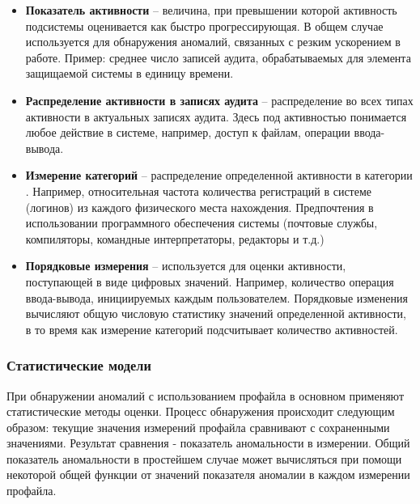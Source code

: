 \begin{itemize}
	\item \textbf{Показатель активности} -- величина, при превышении которой активность 
	подсистемы оценивается как быстро прогрессирующая. В общем случае используется для 
	обнаружения аномалий, связанных с резким ускорением в работе. Пример: среднее число 
	записей аудита, обрабатываемых для элемента защищаемой системы в единицу времени.

	\item \textbf{Распределение активности в записях аудита} -- распределение во всех типах 
	активности в актуальных записях аудита. Здесь под активностью понимается любое действие 
	в системе, например, доступ к файлам, операции ввода-вывода.

	\item \textbf{Измерение категорий} -- распределение определенной активности в 
	категории \footnotemark. Например, относительная частота количества регистраций в 
	системе (логинов) из каждого физического места нахождения. Предпочтения в использовании 
	программного обеспечения системы (почтовые службы, компиляторы, командные интерпретаторы, 
	редакторы и т.д.)

	\item \textbf{Порядковые измерения} -- используется для оценки активности, поступающей 
	в виде цифровых значений. Например, количество операция ввода-вывода, инициируемых каждым 
	пользователем. Порядковые изменения вычисляют общую числовую статистику значений определенной 
	активности, в то время как измерение категорий подсчитывает количество активностей.
\end{itemize}
\autocite{BeynonDavies}



\subsubsection{Статистические модели}

При обнаружении аномалий с использованием профайла в основном применяют статистические 
методы оценки. Процесс обнаружения происходит следующим образом: текущие значения измерений 
профайла сравнивают с сохраненными значениями. Результат сравнения - показатель аномальности 
в измерении. Общий показатель аномальности в простейшем случае может вычисляться при помощи 
некоторой общей функции от значений показателя аномалии в каждом измерении профайла.

